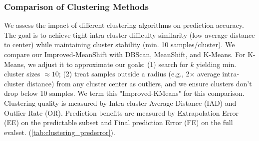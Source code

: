 \subsubsection{Comparison of Clustering Methods}
\label{sec:clustering_ablation}

We assess the impact of different clustering algorithms on prediction accuracy. The goal is to achieve tight intra-cluster difficulty similarity (low average distance to center) while maintaining cluster stability (min. 10 samples/cluster). We compare our Improved-MeanShift with DBScan, MeanShift, and K-Means. For K-Means, we adjust it to approximate our goals: (1) search for $k$ yielding min. cluster sizes $\approx 10$; (2) treat samples outside a radius (e.g., 2$\times$ average intra-cluster distance) from any cluster center as outliers, and we ensure clusters don't drop below 10 samples. We term this "Improved-KMeans" for this comparison. Clustering quality is measured by Intra-cluster Average Distance (IAD) and Outlier Rate (OR). Prediction benefits are measured by Extrapolation Error (EE) on the predictable subset and Final prediction Error (FE) on the full evalset. (\cref{tab:clustering_prederror}).

